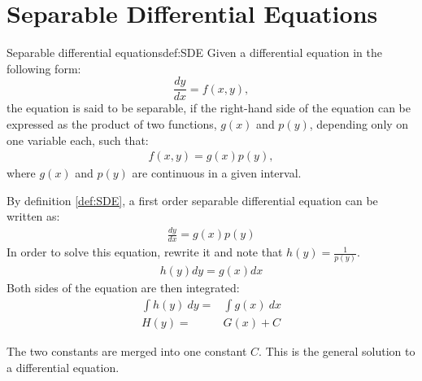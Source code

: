 \section{Separable Differential Equations}\label{SepDiff}
\begin{definition}{Separable differential equations}{def:SDE}
Given a differential equation in the following form: 
$$\frac{dy}{dx} = f(x,y),$$
the equation is said to be separable, if the right-hand side of the equation can be expressed as the product of two functions, $g(x)$ and $p(y)$, depending only on one variable each, such that:
\begin{align}
f(x,y)=g(x)p(y),
\end{align}
where $g(x)$ and $p(y)$ are continuous in a given interval.
\end{definition}
\noindent
By definition \ref{def:SDE}, a first order separable differential equation can be written as:
\begin{align}
	\frac{dy}{dx}=g(x)p(y)
\end{align}
In order to solve this equation, rewrite it and note that $h(y) = \frac{1}{p(y)}$.
\begin{align}
	h(y)dy=g(x)dx
\end{align}
Both sides of the equation are then integrated:
 \begin{align}
 	\int h(y)\ dy =&\int g(x)\ dx   \\
 	H(y)=&G(x)+C \label{SDEG}
 \end{align}
 
The two constants are merged into one constant $C$. This is the general solution to a differential equation. \cite{diffandcomplex}


